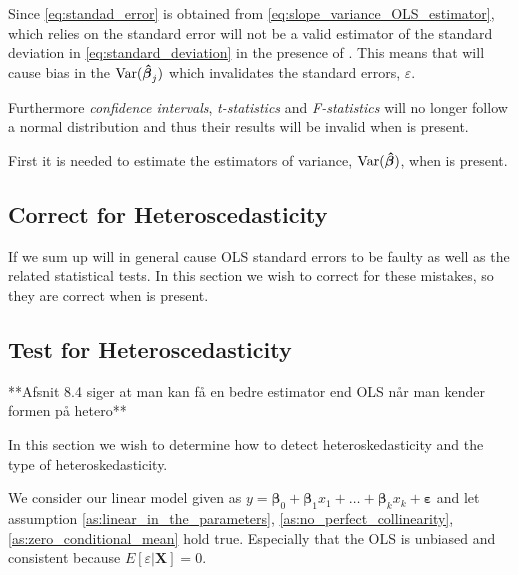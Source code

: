 Since \eqref{eq:standad_error} is obtained from \eqref{eq:slope_variance_OLS_estimator}, which relies on \homo the standard error will not be a valid estimator of the standard deviation in \eqref{eq:standard_deviation} in the presence of \hetero. This means that \hetero will cause bias in the $\operatorname{\text{Var}}(\operatorname{\boldsymbol{\hat{\beta}}}_j)$ which invalidates the standard errors, $\varepsilon$. 

Furthermore \textit{confidence intervals}, \textit{t-statistics} and \textit{F-statistics} will no longer follow a normal distribution and thus their results will be invalid when \hetero is present. 

First it is needed to estimate the estimators of variance, $\operatorname{\text{Var}}(\operatorname{\boldsymbol{\hat{\beta}}})$, when \hetero is present. 

\subsection{Correct for Heteroscedasticity}
If we sum up \hetero will in general cause OLS standard errors to be faulty as well as the related statistical tests. In this section we wish to correct for these mistakes, so they are correct when \hetero is present.
\subsection{Test for Heteroscedasticity}

**Afsnit 8.4 siger at man kan få en bedre estimator end OLS når man kender formen på hetero**

In this section we wish to determine how to detect heteroskedasticity and the type of heteroskedasticity. 

We consider our linear model given as $y = \mathbf{\beta}_0 + \mathbf{\beta}_1x_1 + \ldots + \mathbf{\beta}_kx_k + \mathbf{\varepsilon}$ and let assumption \ref{as:linear_in_the_parameters}, \ref{as:no_perfect_collinearity}, \ref{as:zero_conditional_mean} hold true. Especially that the OLS is unbiased and consistent because $E[\varepsilon | \mathbf{X}] = 0$. 

